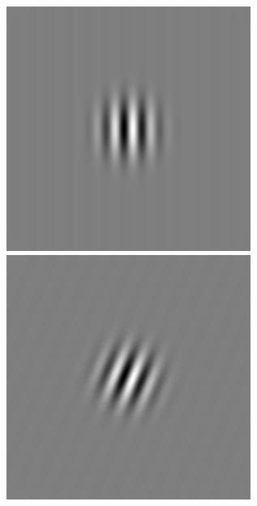 \begin{figure}[ht]
\begin{center}
 \includegraphics[width=\columnwidth/9]{ch4/figures/rGabor4_0.jpg}
 \includegraphics[width=\columnwidth/9]{ch4/figures/rGabor4_1.jpg}

\end{center}
\end{figure}
